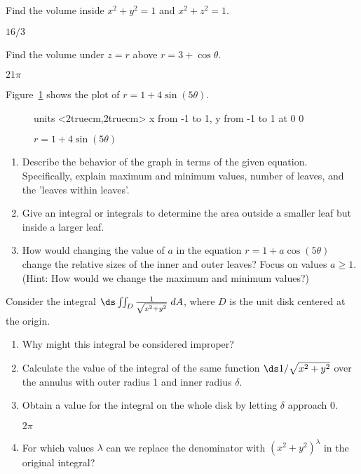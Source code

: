 \begin{enumialphparenastyle}
\begin{ex}
Find the volume inside
$x^2+y^2=1$ and $x^2+z^2=1$.
\begin{sol}
$16/3$
\end{sol}
\end{ex}

\begin{ex}
Find the volume under $z=r$ above $r=3+\cos\theta$.
\begin{sol}
$21\pi$
\end{sol}
\end{ex}

\begin{ex}
Figure~\ref{fig:doubleflower} shows the plot of
$r=1+4\sin(5\theta)$.
\begin{figure}[H]
\centerline{
\vbox{\beginpicture
\normalgraphs
\setcoordinatesystem units <2truecm,2truecm>
\setplotarea x from -1 to 1, y from -1 to 1
 at 0 0
\endpicture}}
\caption{$r=1+4\sin(5\theta)$}
\label{fig:doubleflower}
\end{figure}
\begin{enumerate}
	\item Describe the behavior of the graph in terms of the given
	  equation.  Specifically, explain maximum and minimum values, number
	  of leaves, and the 'leaves within leaves'.
	\item Give an integral or integrals to determine the area outside a
	  smaller leaf but inside a larger leaf.
	\item How would changing the value of $a$ in the equation
	  $r=1+a\cos(5\theta)$ change the relative sizes of the inner and
	  outer leaves? Focus on values $a\geq 1$.  (Hint: How would we change
	  the maximum and minimum values?)
\end{enumerate}
\end{ex}

\begin{ex}
Consider the integral $\ds\iint_D {1\over\sqrt{x^2+y^2}} \;
dA$, where $D$ is the unit disk centered at the origin.
\begin{enumerate}
	\item Why might this integral be considered improper?
	\item Calculate the value of the integral of the same function
	  $\ds 1/\sqrt{x^2+y^2}$ over the annulus with outer radius 1 and
	  inner radius $\delta$.
	\item Obtain a value for the integral on the whole disk by letting
	  $\delta$ approach 0.
		\begin{sol}
		$2\pi$
		\end{sol}
	\item For which values $\lambda$ can we replace the denominator with
	  $(x^2+y^2)^\lambda$ in the original integral?
\end{enumerate}
\end{ex}

\end{enumialphparenastyle}
